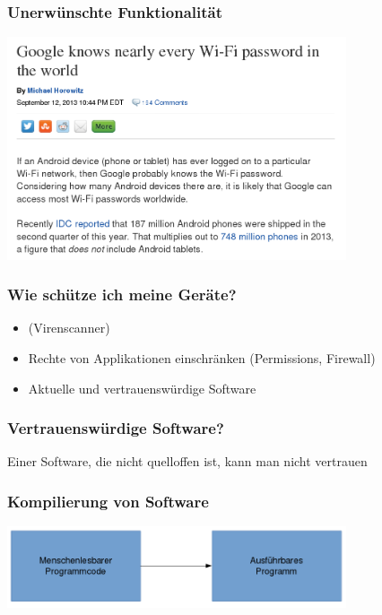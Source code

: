 \documentclass[12pt]{beamer}
\begin{document}
\begin{frame}
  \frametitle{Unerwünschte Funktionalität}
  \begin{center}
    \includegraphics[width=10cm]{img/backdoor-android}
  \par\end{center}
\end{frame}

\begin{frame}
    \frametitle{Wie schütze ich meine Geräte?}
    \begin{itemize}
      \item (Virenscanner)
      \item Rechte von Applikationen einschränken (Permissions, Firewall)
      \item Aktuelle und vertrauenswürdige Software
    \end{itemize}
\end{frame}

\begin{frame}
    \frametitle{Vertrauenswürdige Software?}
    \begin{center}\Large
        Einer Software, die nicht quelloffen ist, kann man nicht vertrauen
    \end{center}
\end{frame}

\begin{frame}
  \frametitle{Kompilierung von Software}
  \begin{center}
    \includegraphics[width=10cm]{img/compilation-process}
  \par\end{center}
\end{frame}
\end{document}
